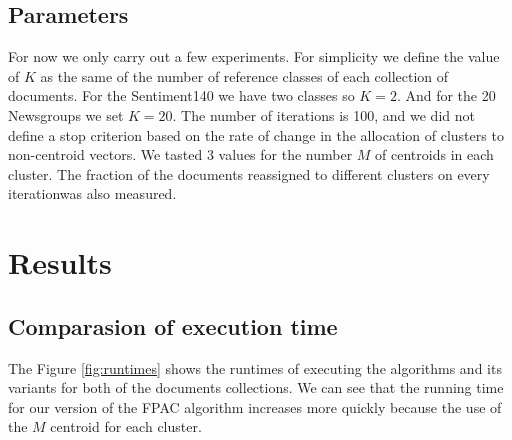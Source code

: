 \documentclass[runningheads]{llncs}
\begin{document}
\subsection{Parameters}


For now we only carry out a few experiments. For simplicity
we define the value of $K$ as the same of the number of
reference classes of each collection of documents. For the
Sentiment140 we have two classes so $K = 2$. And for
the 20 Newsgroups we set $K = 20$. The number of iterations 
is 100, and we did not define a stop criterion based
on the rate of change in the allocation of clusters to non-centroid vectors. We tasted 3 values for the number $M$
of centroids in each cluster.
The fraction of the documents reassigned to different clusters
on every iterationwas also measured.

\section{Results}

\subsection{Comparasion of execution time}

The Figure \ref{fig:runtimes} shows the runtimes
of executing the algorithms and its variants for 
both of the documents collections. We can see that
the running time for our version of the FPAC algorithm
increases more quickly because the use of the $M$
centroid for each cluster.
\end{document}
